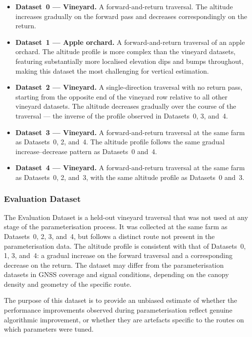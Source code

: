 \begin{itemize}
  \item \textbf{Dataset~0 --- Vineyard.} A forward-and-return traversal. The altitude increases gradually on the forward pass and decreases correspondingly on the return.
  \item \textbf{Dataset~1 --- Apple orchard.} A forward-and-return traversal of an apple orchard. The altitude profile is more complex than the vineyard datasets, featuring substantially more localised elevation dips and bumps throughout, making this dataset the most challenging for vertical estimation.
  \item \textbf{Dataset~2 --- Vineyard.} A single-direction traversal with no return pass, starting from the opposite end of the vineyard row relative to all other vineyard datasets. The altitude decreases gradually over the course of the traversal — the inverse of the profile observed in Datasets~0, 3, and~4.
  \item \textbf{Dataset~3 --- Vineyard.} A forward-and-return traversal at the same farm as Datasets~0, 2, and~4. The altitude profile follows the same gradual increase--decrease pattern as Datasets~0 and~4.
  \item \textbf{Dataset~4 --- Vineyard.} A forward-and-return traversal at the same farm as Datasets~0, 2, and~3, with the same altitude profile as Datasets~0 and~3.
\end{itemize}

\subsubsection{Evaluation Dataset}

The Evaluation Dataset is a held-out vineyard traversal that was not used at any stage of the parameterisation process. It was collected at the same farm as Datasets~0, 2, 3, and~4, but follows a distinct route not present in the parameterisation data. The altitude profile is consistent with that of Datasets~0, 1, 3, and~4: a gradual increase on the forward traversal and a corresponding decrease on the return. The dataset may differ from the parameterisation datasets in GNSS coverage and signal conditions, depending on the canopy density and geometry of the specific route.

The purpose of this dataset is to provide an unbiased estimate of whether the performance improvements observed during parameterisation reflect genuine algorithmic improvement, or whether they are artefacts specific to the routes on which parameters were tuned.

